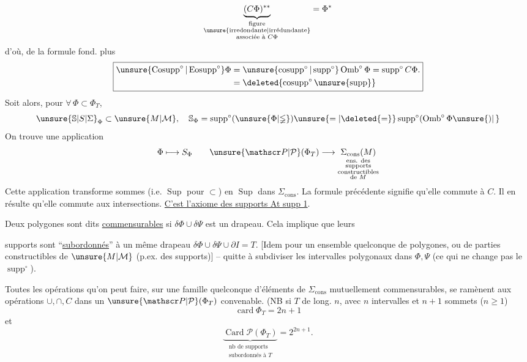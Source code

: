 \[
\underbrace{(C\Phi)^{**}}_{\substack{\text{figure}\\\text{\unsure{irredondante|irrédundante}}\\\text{associée à }C\Phi}}=\Phi^*
\]
d'où,  de la formule fond. plus 
\[
\boxed{\begin{aligned}
\unsure{\operatorname{Cosupp}^{\circ}|\operatorname{Eosupp}^{\circ}}\Phi&=\unsure{\operatorname{cosupp}^{\circ}|\operatorname{supp}^{\circ}}\operatorname{Omb}^{\circ}\Phi=\operatorname{supp}^{\circ}C\Phi.\\
&=\deleted{\operatorname{cosupp}^{\circ}\unsure{\operatorname{supp}}}
\end{aligned}}
\]
Soit alors, pour $\forall\,\Phi\subset\Phi_T$,
\[
\unsure{\mathbb{S}|S|\Sigma}_{\Phi}\subset\unsure{M|\mathcal M},\quad\mathbb{S}_{\Phi}=\operatorname{supp}^{\circ}(\unsure{\Phi|\mathbb{\Phi}})\unsure{=|\deleted{=}}\operatorname{supp}^{\circ}(\operatorname{Omb}^{\circ}\Phi\unsure{)|\,}
\]
On trouve une application
\[
\Phi\longmapsto S_{\Phi}\qquad\unsure{\mathscr P|\mathcal P}(\Phi_T)\longrightarrow\underset{\substack{\text{ens. des}\\\text{supports}\\\text{constructibles}\\\text{de }M}}{\Sigma_{\mathrm{cons}}(M)}
\]
Cette application transforme  sommes (i.e. $\operatorname{Sup}$ pour $\subset$) en $\operatorname{Sup}$ dans $\Sigma_{\mathrm{cons}}$. La formule précédente signifie qu'elle commute à $C$. Il en résulte qu'elle commute aux intersections. \uline{C'est l'axiome des supports At supp 1}.

Deux  polygones \inserted{$\Phi,\Psi$} sont dits \uline{commensurables} si $\delta\Phi\cup\delta\Psi$ est un drapeau. Cela  implique que leurs

supports  sont ``\uline{subordonnés}'' à un même drapeau $\delta\Phi\cup\delta\Psi\cup\partial I=T$. [Idem pour un ensemble quelconque de polygones, ou de parties constructibles de $\unsure{M|\mathcal M}$ (p.ex. des supports)] -- quitte à subdiviser les intervalles polygonaux dans $\Phi,\Psi$ (ce qui ne change pas le $\operatorname{supp}^{\circ}$).

Toutes les opérations  qu'on peut faire, sur une famille quelconque d'éléments de $\Sigma_{\mathrm{cons}}$ mutuellement commensurables, se ramènent aux opérations $\cup,\cap,C$ dans un $\unsure{\mathscr P|\mathcal P}(\Phi_T)$ convenable.
(NB si $T$ de long. $n$, avec $n$ intervalles et $n+1$ sommets ($n\geq1$)
\[
\operatorname{card}\Phi_T=2n+1
\]
et
\[
\underbrace{\operatorname{Card}\mathscr P(\Phi_T)}_{\substack{\text{nb de supports}\\\text{subordonnés à }T}}=2^{2n+1}.
\]


